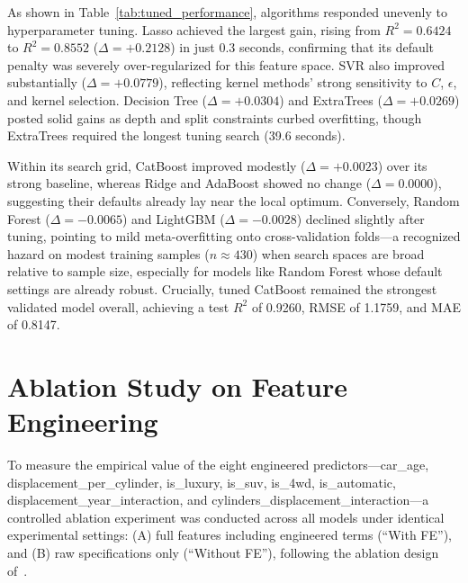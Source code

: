 As shown in Table~\ref{tab:tuned_performance}\cite{atique2026explainable}, algorithms responded unevenly to hyperparameter tuning. Lasso achieved the largest gain, rising from \(R^2 = 0.6424\) to \(R^2 = 0.8552\) (\(\Delta = +0.2128\)) in just 0.3 seconds, confirming that its default penalty was severely over-regularized for this feature space. SVR also improved substantially (\(\Delta = +0.0779\)), reflecting kernel methods' strong sensitivity to \(C\), \(\epsilon\), and kernel selection. Decision Tree (\(\Delta = +0.0304\)) and ExtraTrees (\(\Delta = +0.0269\)) posted solid gains as depth and split constraints curbed overfitting, though ExtraTrees required the longest tuning search (39.6 seconds).

Within its search grid, CatBoost improved modestly (\(\Delta = +0.0023\)) over its strong baseline, whereas Ridge and AdaBoost showed no change (\(\Delta = 0.0000\)), suggesting their defaults already lay near the local optimum. Conversely, Random Forest (\(\Delta = -0.0065\)) and LightGBM (\(\Delta = -0.0028\)) declined slightly after tuning, pointing to mild meta-overfitting onto cross-validation folds---a recognized hazard on modest training samples (\(n \approx 430\)) when search spaces are broad relative to sample size, especially for models like Random Forest whose default settings are already robust. Crucially, tuned CatBoost remained the strongest validated model overall, achieving a test \(R^2\) of 0.9260, RMSE of 1.1759, and MAE of 0.8147.


\section{Ablation Study on Feature Engineering}

To measure the empirical value of the eight engineered predictors---car\_age, displacement\_per\_cylinder, is\_luxury, is\_suv, is\_4wd, is\_automatic, displacement\_year\_interaction, and cylinders\_displacement\_interaction---a controlled ablation experiment was conducted across all models under identical experimental settings: (A) full features including engineered terms (``With FE''), and (B) raw specifications only (``Without FE''), following the ablation design of~\cite{farooq2025interpretable}.

